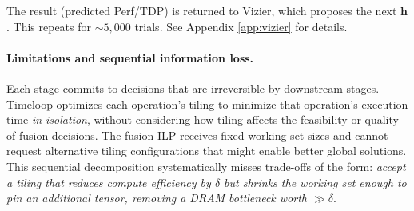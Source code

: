 The result (predicted Perf/TDP) is returned to Vizier, which proposes the next $\mathbf{h}$. This repeats for ${\sim}5{,}000$ trials. See Appendix \ref{app:vizier} for details.


\paragraph{Limitations and sequential information loss.}
Each stage commits to decisions that are irreversible by downstream stages. Timeloop optimizes each operation's tiling to minimize that operation's execution time \emph{in isolation}, without considering how tiling affects the feasibility or quality of fusion decisions. The fusion ILP receives fixed working-set sizes and cannot request alternative tiling configurations that might enable better global solutions. This sequential decomposition systematically misses trade-offs of the form: \emph{accept a tiling that reduces compute efficiency by $\delta$ but shrinks the working set enough to pin an additional tensor, removing a DRAM bottleneck worth $\gg \delta$}.

